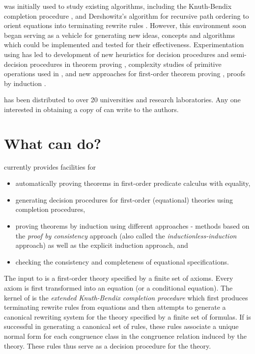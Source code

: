 \RRL was initially used to study existing algorithms, including the
Knuth-Bendix completion procedure \cite{KnuthBendix}, and
Dershowitz's algorithm for recursive path ordering \cite{Dershowitz}
to orient equations into terminating rewrite
rules \cite{KapurSiva}.  However, this environment soon began serving as a
vehicle for generating new ideas, concepts and algorithms which could
be implemented and tested for their effectiveness.  Experimentation
using \RRL has led to development of new heuristics for decision
procedures and semi-decision procedures in theorem proving
\cite{KMN84,ZK882}, complexity studies of primitive operations
used in \RRL \cite{KN871}, and new approaches for first-order theorem
proving \cite{KN85,ZK881}, proofs by induction
\cite{KNZ861,ZKM}.

\RRL has been distributed to over 20 universities and research
laboratories. Any one interested in obtaining a copy of \RRL can write
to the authors.

\section{What can \RRL do?}

\RRL currently
provides facilities for
\begin{itemize}
\item 
automatically proving theorems in first-order predicate calculus
with equality,
\item
generating decision procedures for first-order (equational)
theories using completion procedures,
\item 
proving theorems by 
induction using different approaches - methods
based on the {\sl proof by consistency} approach \cite{Musser80,KM84}
(also called the {\sl inductionless-induction} approach) as well as 
the explicit induction approach, and
\item 
checking the consistency and completeness of equational
specifications.
\end{itemize}

The input to \RRL is a first-order theory specified by a finite set of
axioms.  Every axiom is first transformed into an equation (or a
conditional equation).  The kernel of \RRL is the {\sl extended
Knuth-Bendix completion procedure} \cite{KnuthBendix,LB77,PS81} which
first produces terminating rewrite rules from equations and then
attempts to generate a canonical rewriting system for the theory
specified by a finite set of formulas.  If \RRL is successful in
generating a canonical set of rules, these rules associate a unique
normal form for each congruence class in the congruence relation
induced by the theory.  These rules thus serve as a decision procedure
for the theory.  

